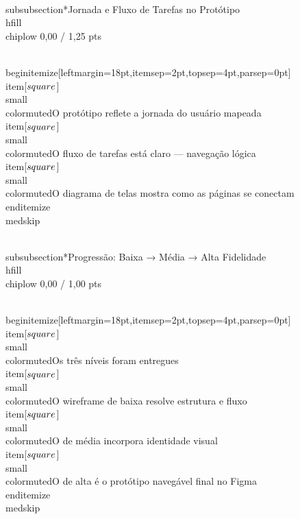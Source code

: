 \documentclass[11pt, a4paper]{article}
\newcommand{\chiplow}[1]{\colorbox{crimsondim}{\color{crimson}\semibold\small\strut\ #1\ }}
\begin{document}
\\subsubsection*{Jornada e Fluxo de Tarefas no Protótipo \\hfill {\\chiplow 0,00 / 1,25 pts}}

\\begin{itemize}[leftmargin=18pt,itemsep=2pt,topsep=4pt,parsep=0pt]
  \\item[$\\square$] {\\small\\color{muted}O protótipo reflete a jornada do usuário mapeada}
  \\item[$\\square$] {\\small\\color{muted}O fluxo de tarefas está claro — navegação lógica}
  \\item[$\\square$] {\\small\\color{muted}O diagrama de telas mostra como as páginas se conectam}
\\end{itemize}
\\medskip

\\subsubsection*{Progressão: Baixa → Média → Alta Fidelidade \\hfill {\\chiplow 0,00 / 1,00 pts}}

\\begin{itemize}[leftmargin=18pt,itemsep=2pt,topsep=4pt,parsep=0pt]
  \\item[$\\square$] {\\small\\color{muted}Os três níveis foram entregues}
  \\item[$\\square$] {\\small\\color{muted}O wireframe de baixa resolve estrutura e fluxo}
  \\item[$\\square$] {\\small\\color{muted}O de média incorpora identidade visual}
  \\item[$\\square$] {\\small\\color{muted}O de alta é o protótipo navegável final no Figma}
\\end{itemize}
\\medskip
\end{document}
